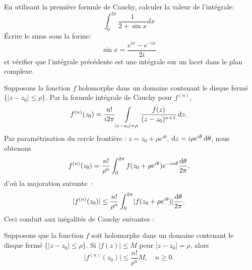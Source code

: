 \begin{exercice}
    En utilisant la première formule de Cauchy, calculer la valeur de l'intégrale:
    \[
    \int_0^{2\pi} \frac{1}{2 + \sin x} dx
    \]
    Écrire le sinus sous la forme:
    \[
\sin x =\frac{e^{ix}-e^{-ix}}{2i}
    \]
    et vérifier que l'intégrale précédente est une intégrale sur un lacet dans le plan
    complexe.
\end{exercice}

Supposons la fonction $f$ holomorphe dans un domaine contenant le disque fermé $\{\lvert z-z_0 \rvert \leq \rho \}$. Par la formule intégrale de Cauchy pour $f^{(n)}$,
\[ f^{(n)}(z_0) =  \frac{n!}{i 2 \pi} \int\limits_{\lvert z-z_0 \rvert = \rho } \frac{f(z)}{(z-z_0)^{n+1}} \mathop{}\mathopen{}\mathrm{d} z.
\]
Par paramétrisation du cercle frontière : $z=z_0 + \rho e^{i \theta}$, $\mathop{}\mathopen{}\mathrm{d} z = i \rho e^{i \theta} \mathop{}\mathopen{}\mathrm{d} \theta$, nous obtenons
\[f^{(n)}(z_0) =  \frac{n!}{\rho^n} \int_0^{2 \pi} f(z_0 + \rho e^{i \theta}) e^{-i n  \theta} \frac{\mathop{}\mathopen{}\mathrm{d} \theta}{2 \pi},\]
d'où la majoration suivante~:
\[\lvert f^{(n)}(z_0)\rvert \leq  \frac{n!}{\rho^n} \int_0^{2 \pi} \lvert f(z_0 + \rho e^{i \theta})\rvert  \frac{\mathop{}\mathopen{}\mathrm{d} \theta}{2 \pi}.\]
Ceci conduit aux inégalités de Cauchy suivantes :
\begin{prop}
Supposons que la fonction $f$ soit holomorphe dans un domaine contenant le disque fermé $\{\lvert z-z_0 \rvert \leq \rho \}$. Si $\lvert f(z) \rvert \leq M$ pour $\lvert z-z_0 \rvert =\rho $, alors
\[\lvert f^{(n)}(z_0)\rvert \leq \frac{n!}{\rho^n} M, \quad n \geq 0.\]
\end{prop}

